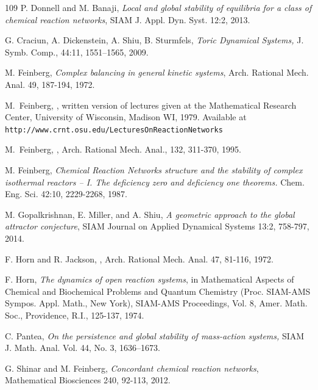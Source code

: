 \documentclass[12pt,letterpaper]{article}
\begin{document}
\begin{thebibliography}{109}
P. Donnell and M. Banaji, 
{\em Local and global stability of equilibria for a class of chemical reaction networks}, SIAM J. Appl. Dyn. Syst. 12:2, 2013. 

G. Craciun, A. Dickenstein, A. Shiu, B. Sturmfels, 
{\em Toric Dynamical Systems, }
{J. Symb. Comp.}, 44:11, 1551--1565,  2009.



M. Feinberg, {\em Complex balancing in general kinetic systems}, Arch. Rational Mech. Anal. 49, 187-194, 1972.




M.~Feinberg,
,
\newblock written version of lectures given at the Mathematical Research 
Center, University of Wisconsin, Madison WI, 1979. Available at 
{\tt http://www.crnt.osu.edu/LecturesOnReactionNetworks}



M.~Feinberg,
,
\newblock Arch. Rational Mech. Anal., 132, 311-370, 1995.



M. Feinberg,
{\em Chemical Reaction Networks structure and the stability of complex isothermal reactors -- 
I. The deficiency zero and deficiency one theorems.} 
{Chem. Eng. Sci.} 42:10, 2229-2268, 1987.


M. Gopalkrishnan, E. Miller, and A. Shiu, 
{\em A geometric approach to the global attractor conjecture},
SIAM Journal on Applied Dynamical Systems 13:2, 758-797, 2014.

F. Horn and  R. Jackson,
, 
\newblock Arch. Rational Mech. Anal. 47, 81-116, 1972.



F. Horn, 
{\em The dynamics of open reaction systems}, in Mathematical Aspects of Chemical and Biochemical Problems and Quantum Chemistry (Proc. SIAM-AMS Sympos. Appl. Math., New York), SIAM-AMS Proceedings, Vol. 8, Amer. Math. Soc., Providence, R.I., 125-137, 1974.


C. Pantea,
{\em On the persistence and global stability of mass-action systems,}
SIAM J. Math. Anal.
Vol. 44, No. 3, 1636--1673. 


G. Shinar and M. Feinberg, {\em Concordant chemical reaction networks},  Mathematical Biosciences 240, 92-113, 2012.


\end{thebibliography}
\end{document}
